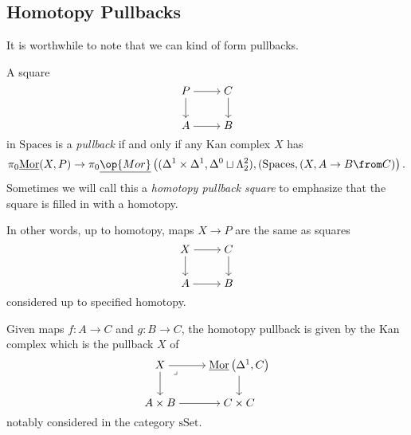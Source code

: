 \documentclass[../notes.tex]{subfiles}
\begin{document}
\subsection{Homotopy Pullbacks}
It is worthwhile to note that we can kind of form pullbacks.
\begin{definition}
	A square
	\[\begin{tikzcd}[cramped]
		P & C \\
		A & B
		\arrow[from=1-1, to=1-2]
		\arrow[from=1-1, to=2-1]
		\arrow[from=1-2, to=2-2]
		\arrow[from=2-1, to=2-2]
	\end{tikzcd}\]
	in $\mathrm{Spaces}$ is a \textit{pullback} if and only if any Kan complex $X$ has
	\[\pi_0\underline{\mathrm{Mor}}(X,P)\to\pi_0\underline{\op{Mor}}\left((\Delta^1\times\Delta^1,\Delta^0\sqcup\Lambda^2_2),(\mathrm{Spaces},(X,A\to B\from C)\right).\]
	Sometimes we will call this a \textit{homotopy pullback square} to emphasize that the square is filled in with a homotopy.
\end{definition}
In other words, up to homotopy, maps $X\to P$ are the same as squares
\[\begin{tikzcd}[cramped]
	X & C \\
	A & B
	\arrow[from=1-1, to=1-2]
	\arrow[from=1-1, to=2-1]
	\arrow[from=1-2, to=2-2]
	\arrow[from=2-1, to=2-2]
\end{tikzcd}\]
considered up to specified homotopy.
\begin{lemma}
	Given maps $f\colon A\to C$ and $g\colon B\to C$, the homotopy pullback is given by the Kan complex which is the pullback $X$ of
	\[\begin{tikzcd}[cramped]
		X & {\underline{\mathrm{Mor}}\left(\Delta^1,C\right)} \\
		{A\times B} & {C\times C}
		\arrow[from=1-1, to=1-2]
		\arrow[from=1-1, to=2-1]
		\arrow["\lrcorner"{anchor=center, pos=0.125}, draw=none, from=1-1, to=2-2]
		\arrow[from=1-2, to=2-2]
		\arrow[from=2-1, to=2-2]
	\end{tikzcd}\]
	notably considered in the category $\mathrm{sSet}$.
\end{lemma}
\end{document}

